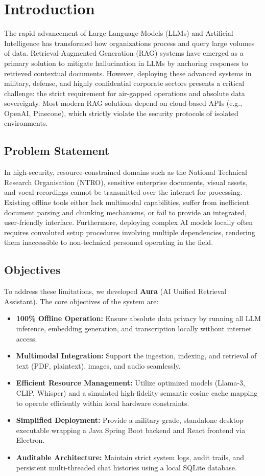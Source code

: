 \section{Introduction}
The rapid advancement of Large Language Models (LLMs) and Artificial Intelligence has transformed how organizations process and query large volumes of data. Retrieval-Augmented Generation (RAG) systems have emerged as a primary solution to mitigate hallucination in LLMs by anchoring responses to retrieved contextual documents. However, deploying these advanced systems in military, defense, and highly confidential corporate sectors presents a critical challenge: the strict requirement for air-gapped operations and absolute data sovereignty. Most modern RAG solutions depend on cloud-based APIs (e.g., OpenAI, Pinecone), which strictly violate the security protocols of isolated environments.

\subsection{Problem Statement}
In high-security, resource-constrained domains such as the National Technical Research Organisation (NTRO), sensitive enterprise documents, visual assets, and vocal recordings cannot be transmitted over the internet for processing. Existing offline tools either lack multimodal capabilities, suffer from inefficient document parsing and chunking mechanisms, or fail to provide an integrated, user-friendly interface. Furthermore, deploying complex AI models locally often requires convoluted setup procedures involving multiple dependencies, rendering them inaccessible to non-technical personnel operating in the field.

\subsection{Objectives}
To address these limitations, we developed \textbf{Aura} (AI Unified Retrieval Assistant). The core objectives of the system are:
\begin{itemize}
    \item \textbf{100\% Offline Operation:} Ensure absolute data privacy by running all LLM inference, embedding generation, and transcription locally without internet access.
    \item \textbf{Multimodal Integration:} Support the ingestion, indexing, and retrieval of text (PDF, plaintext), images, and audio seamlessly.
    \item \textbf{Efficient Resource Management:} Utilize optimized models (Llama-3, CLIP, Whisper) and a simulated high-fidelity semantic cosine cache mapping to operate efficiently within local hardware constraints.
    \item \textbf{Simplified Deployment:} Provide a military-grade, standalone desktop executable wrapping a Java Spring Boot backend and React frontend via Electron.
    \item \textbf{Auditable Architecture:} Maintain strict system logs, audit trails, and persistent multi-threaded chat histories using a local SQLite database.
\end{itemize}
